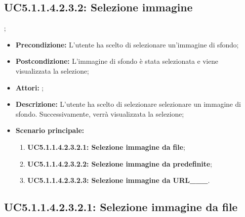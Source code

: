 \subsection{ UC5.1.1.4.2.3.2: Selezione immagine}
;
\begin{itemize}
	\item \textbf{Precondizione:} L'utente ha scelto di selezionare un'immagine di sfondo;
	\item \textbf{Postcondizione:} L'immagine di sfondo è stata selezionata e viene visualizzata la selezione;
	\item \textbf{Attori:} ;
	\item \textbf{Descrizione:} L'utente ha scelto di selezionare selezionare un immagine di sfondo. Successivamente, verrà visualizzata la selezione;
	\item \textbf{Scenario principale:}
	\begin{enumerate}
		\item \textbf{ UC5.1.1.4.2.3.2.1: Selezione immagine da file};
		\item \textbf{ UC5.1.1.4.2.3.2.2: Selezione immagine da predefinite};
		\item \textbf{ UC5.1.1.4.2.3.2.3: Selezione immagine da URL___}.
	\end{enumerate}
\end{itemize}
\subsection{ UC5.1.1.4.2.3.2.1: Selezione immagine da file}

